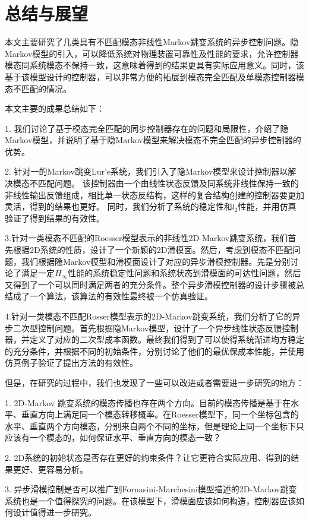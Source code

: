 
\chapter{总结与展望}
	本文主要研究了几类具有不匹配模态非线性Markov跳变系统的异步控制问题。隐Markov模型的引入，可以降低系统对物理装置可靠性及性能的要求，允许控制器模态同系统模态不保持一致，这意味着得到的结果更具有实际应用意义。同时，该基于该模型设计的控制器，可以非常方便的拓展到模态完全匹配及单模态控制器模态不匹配的情况。
	
	本文主要的成果总结如下：
	
	1. 我们讨论了基于模态完全匹配的同步控制器存在的问题和局限性，介绍了隐Markov模型，并说明了基于隐Markov模型来解决模态不完全匹配的异步控制器的优势。
	
	2. 针对一的Markov跳变Lur'e系统，我们引入了隐Markov模型来设计控制器以解决模态不匹配问题。 该控制器由一个由线性状态反馈及同系统非线性保持一致的非线性输出反馈组成，相比单一状态反结构，这样的复合结构创建的控制器要更加灵活，得到的结果也更好。 同时，我们分析了系统的稳定性和$l_2$性能，并用仿真验证了得到结果的有效性。
	
	3.针对一类模态不匹配的Roesser模型表示的非线性2D-Markov跳变系统，我们首先根据2D系统的性质，设计了一个新颖的2D滑模面。然后，考虑到模态不匹配问题，我们根据隐Markov模型和滑模面设计了对应的异步滑模控制器。先是分别讨论了满足一定$H_\infty$性能的系统稳定性问题和系统状态到滑模面的可达性问题，然后又得到了一个可以同时满足两者的充分条件。整个异步滑模控制器的设计步骤被总结成了一个算法，该算法的有效性最终被一个仿真验证。
	
	4.针对一类模态不匹配Rosser模型表示的2D-Markov跳变系统，我们分析了它的异步二次型控制问题。首先根据隐Markov模型，设计了一个异步线性状态反馈控制器，并定义了对应的二次型成本函数。最终我们得到了可以使得系统渐进均方稳定的充分条件，并根据不同的初始条件，分别讨论了他们的最优保成本性能，并使用仿真例子验证了提出方法的有效性。
	
	但是，在研究的过程中，我们也发现了一些可以改进或者需要进一步研究的地方：
	
	1. 2D-Markov 跳变系统的模态传播也存在两个方向。目前的模态传播是基于在水平、垂直方向上满足同一个模态转移概率。在Roesser模型下，同一个坐标包含的水平、垂直两个方向模态，分别来自两个不同的坐标，但是理论上同一个坐标下只应该有一个模态的，如何保证水平、垂直方向的模态一致？
	
	2. 2D系统的初始状态是否存在更好的约束条件？让它更符合实际应用、得到的结果更好、更容易分析。
	
	3. 异步滑模控制是否可以推广到Fornasini-Marchesini模型描述的2D-Markov跳变系统也是一个值得探究的问题。在该模型下，滑模面应该如何构造，控制器应该如何设计值得进一步研究。